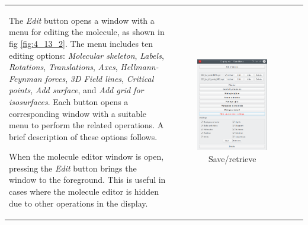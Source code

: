 \documentclass[10pt]{article}
\begin{document}
\begin{tabular}{lcr}
\begin{minipage}{.5\linewidth}
The {\it Edit} button\index{3D graphics!edit molecule} opens a window with a menu for editing the molecule,  
as shown in fig \ref{fig:4_13_2}. The menu includes ten editing options:  
{\it Molecular skeleton}, {\it Labels}, {\it Rotations},  
{\it Translations}, {\it Axes}, {\it Hellmann-Feynman forces},  
{\it 3D Field lines}, {\it Critical points}, {\it Add surface}, and  
{\it Add grid for isosurfaces}. Each button opens a corresponding window  
with a suitable menu to perform the related operations. A brief description  
of these options follows.  

When the molecule editor window is open, pressing the {\it Edit} button\index{3D graphics!show molecule editor}  
brings the window to the foreground. This is useful in cases where the molecule editor  
is hidden due to other operations in the display.



\end{minipage}
&
\begin{minipage}{.5\linewidth}

\begin{figure}[H]
    \begin{center}
        \includegraphics[width=0.6\linewidth]{damqt320_3D_settings.png}
    \end{center}
    \vspace*{5mm}
    \caption{Save/retrieve \label{fig:4_12}}
\end{figure}


\end{minipage}
\end{tabular}
\end{document}
